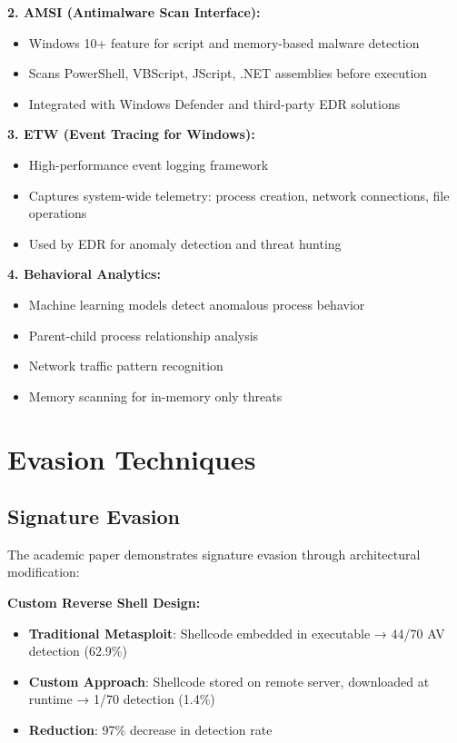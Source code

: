 \documentclass[11pt,conference]{IEEEtran}
\begin{document}
\textbf{2. AMSI (Antimalware Scan Interface):}
\begin{itemize}
    \item Windows 10+ feature for script and memory-based malware detection
    \item Scans PowerShell, VBScript, JScript, .NET assemblies before execution
    \item Integrated with Windows Defender and third-party EDR solutions
\end{itemize}

\textbf{3. ETW (Event Tracing for Windows):}
\begin{itemize}
    \item High-performance event logging framework
    \item Captures system-wide telemetry: process creation, network connections, file operations
    \item Used by EDR for anomaly detection and threat hunting
\end{itemize}

\textbf{4. Behavioral Analytics:}
\begin{itemize}
    \item Machine learning models detect anomalous process behavior
    \item Parent-child process relationship analysis
    \item Network traffic pattern recognition
    \item Memory scanning for in-memory only threats
\end{itemize}

\section{Evasion Techniques}

\subsection{Signature Evasion}

The academic paper demonstrates signature evasion through architectural modification:

\textbf{Custom Reverse Shell Design:}
\begin{itemize}
    \item \textbf{Traditional Metasploit}: Shellcode embedded in executable → 44/70 AV detection (62.9\%)
    \item \textbf{Custom Approach}: Shellcode stored on remote server, downloaded at runtime → 1/70 detection (1.4\%)
    \item \textbf{Reduction}: 97\% decrease in detection rate
\end{itemize}
\end{document}
